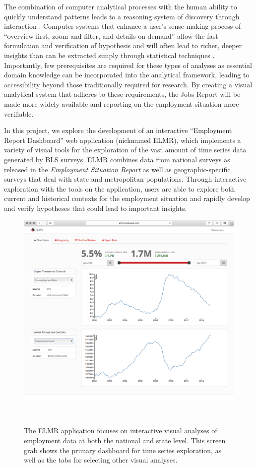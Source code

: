 \documentclass{sigchi}
\begin{document}
The combination of computer analytical processes with the human ability to quickly understand patterns leads to a reasoning system of discovery through interaction \cite{green_visual_2008}. Computer systems that enhance a user's sense-making process of ``overview first, zoom and filter, and details on demand'' allow the fast formulation and verification of hypothesis and will often lead to richer, deeper insights than can be extracted simply through statistical techniques \cite{heer_interactive_2012}. Importantly, few prerequisites are required for these types of analyses as essential domain knowledge can be incorporated into the analytical framework, leading to accessibility beyond those traditionally required for research. By creating a visual analytical system that adheres to these requirements, the Jobs Report will be made more widely available and reporting on the employment situation more verifiable.

In this project, we explore the development of an interactive ``Employment Report Dashboard'' web application (nicknamed ELMR), which implements a variety of visual tools for the exploration of the vast amount of time series data generated by BLS surveys. ELMR combines data from national surveys as released in the \textit{Employment Situation Report} as well as geographic-specific surveys that deal with state and metropolitan populations. Through interactive exploration with the tools on the application, users are able to explore both current and historical contexts for the employment situation and rapidly develop and verify hypotheses that could lead to important insights.

\begin{figure}[!ht]
  \centering
  \includegraphics[width=1.6\columnwidth]{figures/dashboard.png}
  \caption{The ELMR application focuses on interactive visual analyses of employment data at both the national and state level. This screen grab shows the primary dashboard for time series exploration, as well as the tabs for selecting other visual analyses.}~\label{fig:dashboard}
\end{figure}
\end{document}
